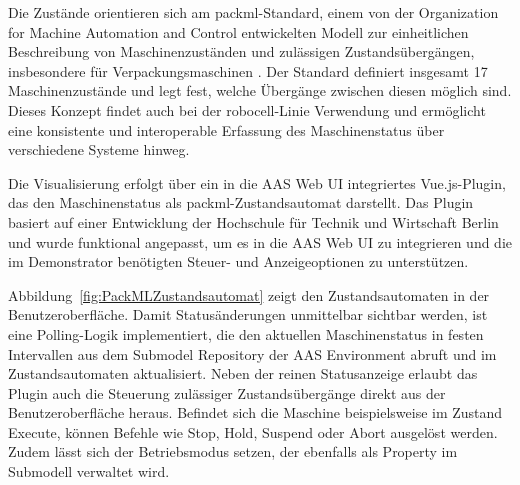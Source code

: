 Die Zustände orientieren sich am \acs{packml}-Standard, einem von der Organization for Machine Automation and Control entwickelten Modell zur einheitlichen Beschreibung von Maschinenzuständen und zulässigen Zustandsübergängen, insbesondere für Verpackungsmaschinen \cite{OMAC}. 
Der Standard definiert insgesamt 17 Maschinenzustände und legt fest, welche Übergänge zwischen diesen möglich sind. 
Dieses Konzept findet auch bei der robocell-Linie Verwendung und ermöglicht eine konsistente und interoperable Erfassung des Maschinenstatus über verschiedene Systeme hinweg.

Die Visualisierung erfolgt über ein in die AAS Web UI integriertes Vue.js-Plugin, das den Maschinenstatus als \acs{packml}-Zustandsautomat darstellt.
Das Plugin basiert auf einer Entwicklung der Hochschule für Technik und Wirtschaft Berlin \cite{HTW1, HTW2} und wurde funktional angepasst, um es in die AAS Web UI zu integrieren und die im Demonstrator benötigten Steuer- und Anzeigeoptionen zu unterstützen.

Abbildung~\ref{fig:PackMLZustandsautomat} zeigt den Zustandsautomaten in der Benutzeroberfläche.
Damit Statusänderungen unmittelbar sichtbar werden, ist eine Polling-Logik implementiert, die den aktuellen Maschinenstatus in festen Intervallen aus dem Submodel Repository der AAS Environment abruft und im Zustandsautomaten aktualisiert.
Neben der reinen Statusanzeige erlaubt das Plugin auch die Steuerung zulässiger Zustandsübergänge direkt aus der Benutzeroberfläche heraus.
Befindet sich die Maschine beispielsweise im Zustand Execute, können Befehle wie Stop, Hold, Suspend oder Abort ausgelöst werden.
Zudem lässt sich der Betriebsmodus setzen, der ebenfalls als Property im Submodell verwaltet wird.

